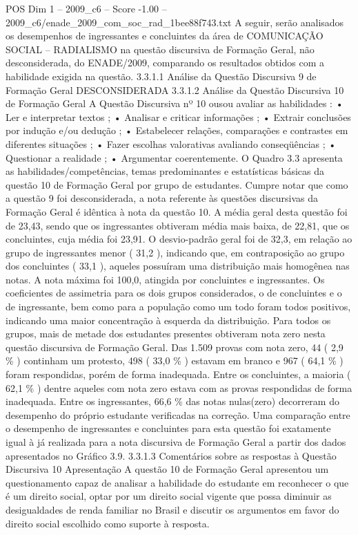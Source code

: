 \begin{textsample}{POS Dim 1 – 2009\_c6 – Score -1.00 – 2009\_c6/enade\_2009\_com\_soc\_rad\_1bee88f743.txt}
A seguir, serão analisados os desempenhos de ingressantes e concluintes da área de COMUNICAÇÃO SOCIAL – RADIALISMO na questão discursiva de Formação Geral, não desconsiderada, do ENADE/2009, comparando os resultados obtidos com a habilidade exigida na questão. 3.3.1.1 Análise da Questão Discursiva 9 de Formação Geral DESCONSIDERADA 3.3.1.2 Análise da Questão Discursiva 10 de Formação Geral A Questão Discursiva nº 10 ousou avaliar as habilidades : • Ler e interpretar textos ; • Analisar e criticar informações ; • Extrair conclusões por indução e/ou dedução ; • Estabelecer relações, comparações e contrastes em diferentes situações ; • Fazer escolhas valorativas avaliando conseqüências ; • Questionar a realidade ; • Argumentar coerentemente.
O Quadro 3.3 apresenta as habilidades/competências, temas predominantes e estatísticas básicas da questão 10 de Formação Geral por grupo de estudantes.
Cumpre notar que como a questão 9 foi desconsiderada, a nota referente às questões discursivas da Formação Geral é idêntica à nota da questão 10.
A média geral desta questão foi de 23,43, sendo que os ingressantes obtiveram média mais baixa, de 22,81, que os concluintes, cuja média foi 23,91.
O desvio-padrão geral foi de 32,3, em relação ao grupo de ingressantes menor ( 31,2 ), indicando que, em contraposição ao grupo dos concluintes ( 33,1 ), aqueles possuíram uma distribuição mais homogênea nas notas.
A nota máxima foi 100,0, atingida por concluintes e ingressantes.
Os coeficientes de assimetria para os dois grupos considerados, o de concluintes e o de ingressante, bem como para a população como um todo foram todos positivos, indicando uma maior concentração à esquerda da distribuição.
Para todos os grupos, mais de metade dos estudantes presentes obtiveram nota zero nesta questão discursiva de Formação Geral.
Das 1.509 provas com nota zero, 44 ( 2,9 \% ) continham um protesto, 498 ( 33,0 \% ) estavam em branco e 967 ( 64,1 \% ) foram respondidas, porém de forma inadequada.
Entre os concluintes, a maioria ( 62,1 \% ) dentre aqueles com nota zero estava com as provas respondidas de forma inadequada.
Entre os ingressantes, 66,6 \% das notas nulas(zero) decorreram do desempenho do próprio estudante verificadas na correção.
Uma comparação entre o desempenho de ingressantes e concluintes para esta questão foi exatamente igual à já realizada para a nota discursiva de Formação Geral a partir dos dados apresentados no Gráfico 3.9. 3.3.1.3 Comentários sobre as respostas à Questão Discursiva 10 Apresentação A questão 10 de Formação Geral apresentou um questionamento capaz de analisar a habilidade do estudante em reconhecer o que é um direito social, optar por um direito social vigente que possa diminuir as desigualdades de renda familiar no Brasil e discutir os argumentos em favor do direito social escolhido como suporte à resposta.

\end{textsample}
